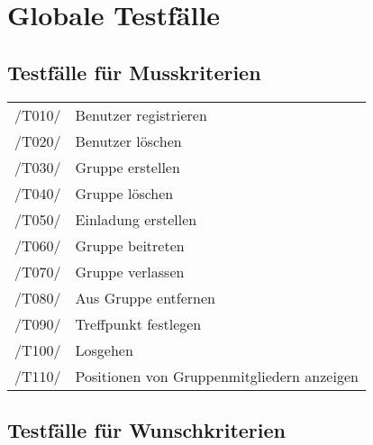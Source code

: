 \section{Globale Testfälle}
\subsection{Testfälle für Musskriterien}
\begin{tabular}{ll}
/T010/ & Benutzer registrieren \\
/T020/ & Benutzer löschen \\
/T030/ & Gruppe erstellen \\
/T040/ & Gruppe löschen \\
/T050/ & Einladung erstellen \\
/T060/ & Gruppe beitreten \\
/T070/ & Gruppe verlassen \\
/T080/ & Aus Gruppe entfernen \\
/T090/ & Treffpunkt festlegen \\
/T100/ & Losgehen \\ %
/T110/ & Positionen von Gruppenmitgliedern anzeigen \\
\end{tabular}

\subsection{Testfälle für Wunschkriterien}
\begin{tabular}{ll}
\end{tabular}

